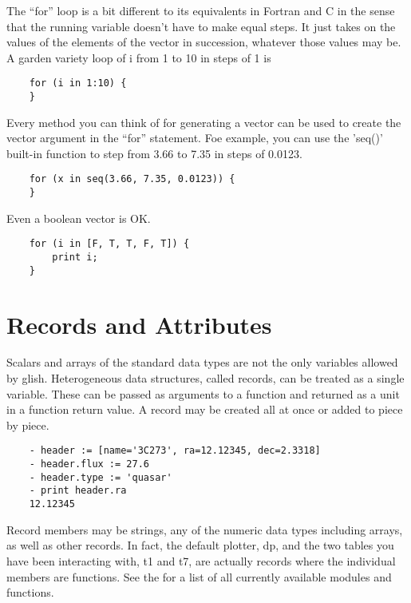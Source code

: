The ``for'' loop is a bit different to its equivalents in Fortran and C in
the sense that the running variable doesn't have to make equal steps.  It
just takes on the values of the elements of the vector in succession,
whatever those values may be.  A garden variety loop of i from 1 to 10 in
steps of 1 is

\begin{verbatim}
	for (i in 1:10) {
	}
\end{verbatim}

Every method you can think of for generating a vector can be used to create
the vector argument in the ``for'' statement.  Foe example, you can use the
'seq()' built-in function to step from 3.66 to 7.35 in steps of 0.0123.

\begin{verbatim}
	for (x in seq(3.66, 7.35, 0.0123)) {
	}
\end{verbatim}

Even a boolean vector is OK.

\begin{verbatim}
	for (i in [F, T, T, F, T]) {
	    print i;
	}
\end{verbatim}

\section{Records and Attributes}

    Scalars and arrays of the standard data types are not the only
variables allowed by glish.  Heterogeneous data structures, called records,
can be treated as a single variable.  These can be passed as arguments to a
function and returned as a unit in a function return value.  A record may be
created all at once or added to piece by piece.

\begin{verbatim}
	- header := [name='3C273', ra=12.12345, dec=2.3318]
	- header.flux := 27.6
	- header.type := 'quasar'
	- print header.ra
	12.12345
\end{verbatim}

    Record members may be strings, any of the numeric data types
including arrays, as well as other records.  In fact, the default
plotter, dp, and the two tables you have been interacting
with, t1 and t7, are actually records where the individual members
are functions.
See the  for a list of
all currently available modules and functions.

